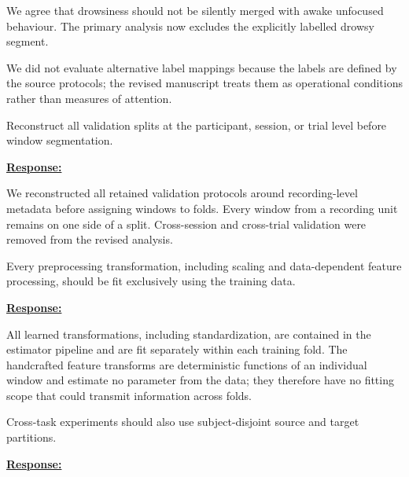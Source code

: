 \documentclass{article}
\begin{document}
We agree that drowsiness should not be silently merged with awake unfocused
behaviour. The primary analysis now excludes the explicitly labelled drowsy
segment.

We did not evaluate alternative label mappings because the labels are defined by
the source protocols; the revised manuscript treats them as operational
conditions rather than measures of attention.

\vspace{0.3cm}


\begin{cmt}{}{}

Reconstruct all validation splits at the participant, session, or trial level
before window segmentation.

\end{cmt}
\vspace{0.1cm}
\noindent
\underline{\textbf{Response:}}
\vspace{0.2cm}

We reconstructed all retained validation protocols around recording-level
metadata before assigning windows to folds. Every window from a recording unit
remains on one side of a split. Cross-session and cross-trial validation were
removed from the revised analysis.

\vspace{0.3cm}


\begin{cmt}{}{}

Every preprocessing transformation, including scaling and data-dependent feature
processing, should be fit exclusively using the training data.

\end{cmt}
\vspace{0.1cm}
\noindent
\underline{\textbf{Response:}}
\vspace{0.2cm}

All learned transformations, including standardization, are contained in the
estimator pipeline and are fit separately within each training fold. The
handcrafted feature transforms are deterministic functions of an individual
window and estimate no parameter from the data; they therefore have no fitting
scope that could transmit information across folds.

\vspace{0.3cm}


\begin{cmt}{}{}

Cross-task experiments should also use subject-disjoint source and target
partitions.

\end{cmt}
\vspace{0.1cm}
\noindent
\underline{\textbf{Response:}}
\vspace{0.2cm}
\end{document}
